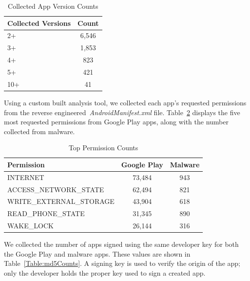 \documentclass{sig-alternate-05-2015}
\begin{document}
\begin{table}[ht]
\begin{center}
\caption{Collected App Version Counts}
\label{Table:versionCounts}
 \begin{tabular}{ | l | c | } \hline

	  \bfseries Collected Versions & \bfseries   Count \\ \hline
	
	2+ &	6,546 \\ \hline
	3+ &	1,853 \\ \hline
	4+ &	823 \\ \hline
	5+ &	421 \\ \hline
    10+ & 41 \\ \hline
        	 	
  \end{tabular}
\end{center}
\end{table}


Using a custom built analysis tool, we collected each app's requested permissions from the reverse engineered~\emph{AndroidManifest.xml} file. Table~\ref{Table:permissionCounts} displays the five most requested permissions from Google Play apps, along with the number collected from malware.

\begin{table}[ht]
\begin{center}
\caption{Top Permission Counts}
\label{Table:permissionCounts}
 \begin{tabular}{ | l | c | c | } \hline

	  \bfseries Permission & \bfseries   Google Play & \bfseries Malware \\ \hline
	
	INTERNET &	73,484 & 943  \\ \hline
	ACCESS\_NETWORK\_STATE &	62,494 & 821 \\ \hline
	WRITE\_EXTERNAL\_STORAGE &	43,904 & 618\\ \hline
	READ\_PHONE\_STATE &	31,345 & 890 \\ \hline
	WAKE\_LOCK & 26,144 & 316 \\ \hline	
        	 	
  \end{tabular}
\end{center}
\end{table}


We collected the number of apps signed using the same developer key for both the Google Play and malware apps. These values are shown in Table~\ref{Table:md5Counts}. A signing key is used to verify the origin of the app; only the developer holds the proper key used to sign a created app.
\end{document}
